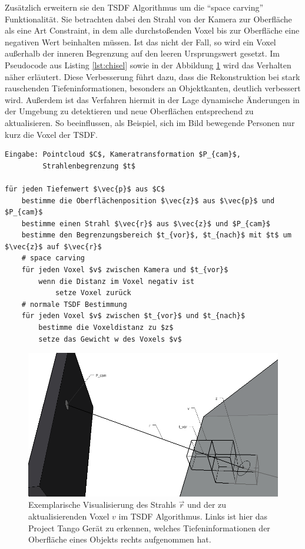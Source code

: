 Zusätzlich erweitern sie den TSDF Algorithmus um die \enquote{space carving} Funktionalität. Sie betrachten dabei den Strahl von der Kamera zur Oberfläche als eine Art Constraint, in dem alle durchstoßenden Voxel bis zur Oberfläche eine negativen Wert beinhalten müssen. Ist das nicht der Fall, so wird ein Voxel außerhalb der inneren Begrenzung auf den leeren Ursprungswert gesetzt. Im Pseudocode aus Listing \ref{lst:chisel} sowie in der Abbildung \ref{fig:tsdf-sketch} wird das Verhalten näher erläutert. Diese Verbesserung führt dazu, dass die Rekonstruktion bei stark rauschenden Tiefeninformationen, besonders an Objektkanten, deutlich verbessert wird. Außerdem ist das Verfahren hiermit in der Lage dynamische Änderungen in der Umgebung zu detektieren und neue Oberflächen entsprechend zu aktualisieren. So beeinflussen, als Beispiel, sich im Bild bewegende Personen nur kurz die Voxel der TSDF. \citep{Klingensmith_2015_7924}


\begin{lstlisting}[mathescape,caption=Chisel TSDF Algorithmus, label=lst:chisel, float=htbp]
Eingabe: Pointcloud $C$, Kameratransformation $P_{cam}$, 
         Strahlenbegrenzung $t$

für jeden Tiefenwert $\vec{p}$ aus $C$
    bestimme die Oberflächenposition $\vec{z}$ aus $\vec{p}$ und $P_{cam}$
    bestimme einen Strahl $\vec{r}$ aus $\vec{z}$ und $P_{cam}$
    bestimme den Begrenzungsbereich $t_{vor}$, $t_{nach}$ mit $t$ um $\vec{z}$ auf $\vec{r}$
    # space carving
    für jeden Voxel $v$ zwischen Kamera und $t_{vor}$
        wenn die Distanz im Voxel negativ ist
            setze Voxel zurück
    # normale TSDF Bestimmung
    für jeden Voxel $v$ zwischen $t_{vor}$ und $t_{nach}$
        bestimme die Voxeldistanz zu $z$
        setze das Gewicht w des Voxels $v$
\end{lstlisting}

\begin{figure}[h]
  \centering
	\includegraphics[width=1.0\textwidth]{content/images/methods/tsdf-sketch.png} 
  \caption{Exemplarische Visualisierung des Strahls \(\vec{r}\) und der zu aktualisierenden Voxel \(v\) im TSDF Algorithmus. Links ist hier das Project Tango Gerät zu erkennen, welches Tiefeninformationen der Oberfläche eines Objekts rechts aufgenommen hat.}
  \label{fig:tsdf-sketch}
\end{figure}


